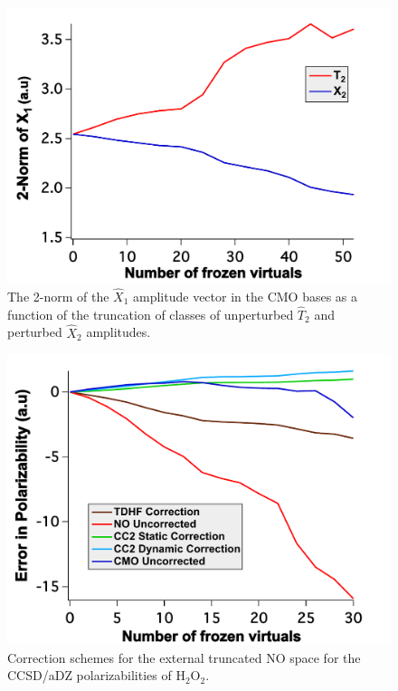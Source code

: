 \begin{figure}
  \centering
  \includegraphics[width=0.6\linewidth]{figures/norm.pdf}
  \caption{The 2-norm of the $\hat{X}_1$ amplitude vector in
the CMO bases as a function of the truncation of classes of unperturbed 
$\hat{T}_2$ and perturbed $\hat{X}_2$ amplitudes.}
   \label{fig:norm}
\end{figure}
\begin{figure}
  \centering
  \includegraphics[width=0.6\linewidth]{figures/correctn.pdf}
  \caption{Correction schemes for the external truncated
NO space for the CCSD/aDZ polarizabilities of H$_2$O$_2$.}
   \label{fig:corrections}
\end{figure}

